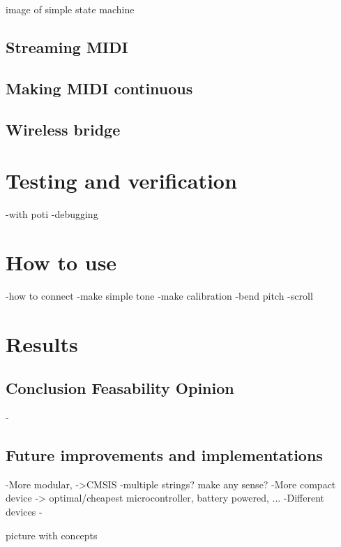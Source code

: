 \documentclass{article}
\begin{document}
image of simple state machine

\subsection{Streaming MIDI}

\subsection{Making MIDI continuous}

\subsection{Wireless bridge}

\section{Testing and verification}
-with poti
-debugging

\section{How to use}
-how to connect
-make simple tone
-make calibration
-bend pitch
-scroll

\section{Results}

\subsection{Conclusion Feasability Opinion }
-

\subsection{Future improvements and implementations}
-More modular, ->CMSIS
-multiple strings? make any sense?
-More compact device -> optimal/cheapest microcontroller, battery powered, ...
-Different devices
-

picture with concepts
\end{document}
